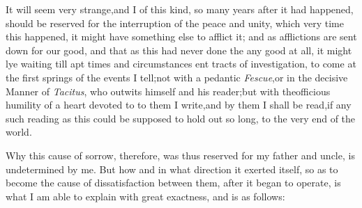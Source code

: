 \documentclass{article}
\begin{document}
It will seem very strange,\tsh and I\break 
{}
of this kind, so many years after it had happened,
should be reserved for the interruption of the peace and unity,
which 
very time this happened, it might have 
something else to afflict it; and as afflictions
are sent down for our good, and that as this
had never done the 
any good at all, it might lye\break
waiting till apt times and circumstances 
ent tracts of investigation, to come at
the first springs of the events I tell;\tsk\break not with a pedantic
\textit{Fescue},\tsk or in the decisive Manner of \textit{Tacitus},
who outwits himself and his reader;\tsk but with the\break officious
humility of a heart devoted to 
to them I write,\tsh and by them I
shall be read,\tsh if any such reading as this could be
supposed to hold out so long,\break
to the very end of the
world.\\\eject

Why this cause of sorrow, therefore, was thus reserved for my
father and uncle, is undetermined by me. But how and in what
direction it exerted itself, so as to become the cause of
dissatisfaction between them, after it began to operate, is what I
am able to explain with great exactness, and is as follows:
\end{document}

